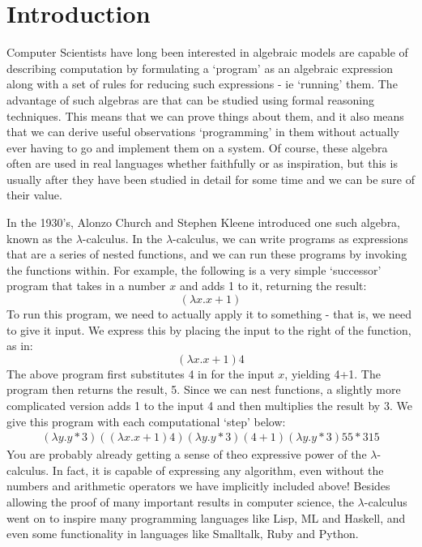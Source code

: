 \chapter{Introduction}
	Computer Scientists have long been interested in algebraic models are capable of describing computation by formulating a `program' as an algebraic expression along with a set of rules for reducing such expressions - ie `running' them.  The advantage of such algebras are that can be studied using formal reasoning techniques.  This means that we can prove things about them, and it also means that we can derive useful observations `programming' in them without actually ever having to go and implement them on a system.  Of course, these algebra often are used in real languages whether faithfully or as inspiration, but this is usually after they have been studied in detail for some time and we can be sure of their value.
	
	In the 1930's, Alonzo Church and Stephen Kleene introduced one such algebra, known as the $\lambda$-calculus.  In the $\lambda$-calculus, we can write programs as expressions that are a series of nested functions, and we can run these programs by invoking the functions within.  For example, the following is a very simple `successor' program that takes in a number $x$ and adds 1 to it, returning the result:
	\[
		(\lambda x. x + 1)
	\]
To run this program, we need to actually apply it to something - that is, we need to give it input.  We express this by placing the input to the right of the function, as in:
\[
	(\lambda x. x + 1) 4
\]
The above program first substitutes 4 in for the input $x$, yielding 4+1.  The program then returns the result, 5.  Since we can nest functions, a slightly more complicated version adds 1 to the input 4 and then multiplies the result by 3.  We give this program with each computational `step' below:
\begin{align*}
	(\lambda y. y * 3) ((\lambda x. x + 1) 4)
	(\lambda y. y * 3) (4+1)
	(\lambda y. y * 3) 5
	5 * 3
	15
\end{align*}
You are probably already getting a sense of theo expressive power of the $\lambda$-calculus.  In fact, it is capable of expressing any algorithm, even without the numbers and arithmetic operators we have implicitly included above!  Besides allowing the proof of many important results in computer science, the $\lambda$-calculus went on to inspire many programming languages like Lisp, ML and Haskell, and even some functionality in languages like Smalltalk, Ruby and Python.

